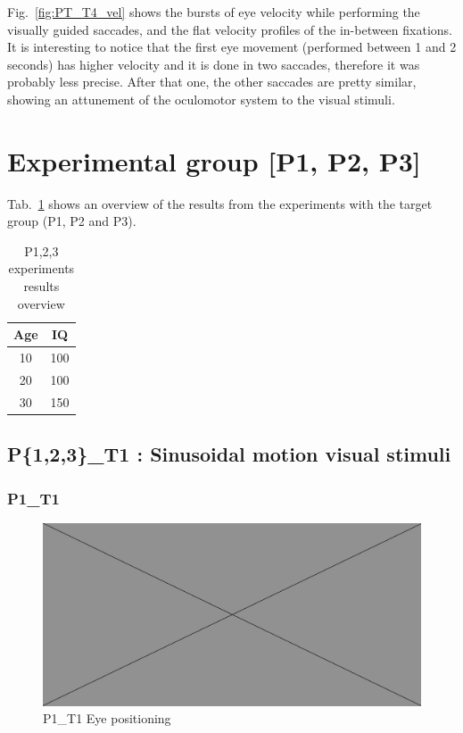 Fig.~\ref{fig:PT_T4_vel} shows the bursts of eye velocity while performing the visually guided saccades, and the flat velocity profiles of the in-between fixations. It is interesting to notice that the first eye movement (performed between 1 and 2 seconds) has higher velocity and it is done in two saccades, therefore it was probably less precise. After that one, the other saccades are pretty similar, showing an attunement of the oculomotor system to the visual stimuli.





\section{Experimental group [P1, P2, P3]}
\label{sec:resexpgroup}

Tab.~\ref{tab:expgroupresultssummary} shows an overview of the results from the experiments with the target group (P1, P2 and P3).

\begin{table}[h]
  \centering
  \begin{tabular}{c|c}
    Age  & IQ  \\ 
    \hline
    10   & 100 \\
    20   & 100 \\
    30   & 150
  \end{tabular}
  \caption{P{1,2,3} experiments results overview}
  \label{tab:expgroupresultssummary}
\end{table}



\subsection{P\{1,2,3\}\_T1 : Sinusoidal motion visual stimuli}
\label{sec:P123_T1}

\subsubsection{P1\_T1}
\label{sec:P1_T1}

\begin{figure}[h]
  \centering
  \includegraphics[width=.5\textwidth]{figures/placeholderImg.jpg}
  \caption[P1\_T1 Eye positioning]{P1\_T1 Eye positioning}
  \label{fig:P1_T1_pos}
\end{figure}

